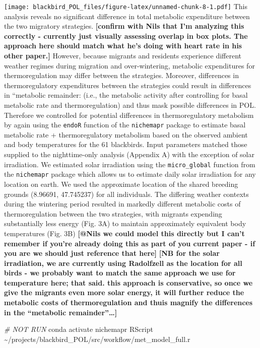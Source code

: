 \documentclass[
]{article}
\newenvironment{Shaded}{\begin{snugshade}}{\end{snugshade}}
\newcommand{\CommentTok}[1]{\textcolor[rgb]{0.56,0.35,0.01}{\textit{#1}}}
\newcommand{\ExtensionTok}[1]{#1}
\newcommand{\NormalTok}[1]{#1}
\begin{document}
\texttt{[image: blackbird\_POL\_files/figure-latex/unnamed-chunk-8-1.pdf]}
This analysis reveals no significant difference in total metabolic
expenditure between the two migratory strategies. \textbf{{[}confirm
with Nils that I'm analyzing this correctly - currently just visually
assessing overlap in box plots. The approach here should match what he's
doing with heart rate in his other paper.{]}} However, because migrants
and residents experience different weather regimes during migration and
over-wintering, metabolic expenditures for thermoregulation may differ
between the strategies. Moreover, differences in thermoregulatory
expenditures between the strategies could result in differences in
``metabolic remainder: (i.e., the metabolic activity after controlling
for basal metabolic rate and thermoregulation) and thus mask possible
differences in POL. Therefore we controlled for potential differences in
thermoregulatory metabolism by again using the \texttt{endoR} function
of the \texttt{nichemapr} package to estimate basal metabolic rate +
thermoregulatory metabolism based on the observed ambient and body
temperatures for the 61 blackbirds. Input parameters matched those
supplied to the nighttime-only analysis (Appendix A) with the exception
of solar irradiation. We estimated solar irradiation using the
\texttt{micro\_global} function from the \texttt{nichemapr} package
which allows us to estimate daily solar irradiation for any location on
earth. We used the approximate location of the shared breeding grounds
(8.96691, 47.745237) for all individuals. The differing weather contexts
during the wintering period resulted in markedly different metabolic
costs of thermoregulation between the two strategies, with migrants
expending substantially less energy (Fig. 3A) to maintain approximately
equivalent body temperatures (Fig. 3B) \textbf{{[}@Nils we could model
this directly but I can't remember if you're already doing this as part
of you current paper - if you are we should just reference that here{]}}
\textbf{{[}NB for the solar irradiation, we are currently using
Radolfzell as the location for all birds - we probably want to match the
same approach we use for temperature here; that said. this approach is
conservative, so once we give the migrants even more solar energy, it
will further reduce the metabolic costs of thermoregulation and thuis
magnify the differences in the ``metabolic remainder''\ldots{]}}

\begin{Shaded}
\begin{Highlighting}[]
\CommentTok{\# NOT RUN}
\ExtensionTok{conda}\NormalTok{ activate nichemapr}
\ExtensionTok{RScript}\NormalTok{ \textasciitilde{}/projects/blackbird\_POL/src/workflow/met\_model\_full.r}
\end{Highlighting}
\end{Shaded}
\end{document}
